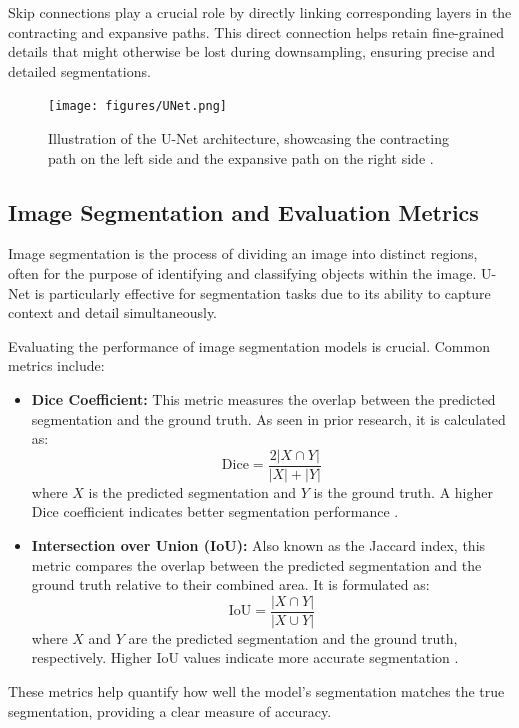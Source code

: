 \documentclass[preprint,12pt]{elsarticle}
\begin{document}
Skip connections play a crucial role by directly linking corresponding layers in the contracting and expansive paths. This direct connection helps retain fine-grained details that might otherwise be lost during downsampling, ensuring precise and detailed segmentations.

\begin{figure}[h!]
\centering
\texttt{[image: figures/UNet.png]}
\caption{Illustration of the U-Net architecture, showcasing the contracting path on the left side and the expansive path on the right side \cite{ronneberger2015u}.}
\label{fig:unet_architecture}
\end{figure}

\subsection{Image Segmentation and Evaluation Metrics}

Image segmentation is the process of dividing an image into distinct regions, often for the purpose of identifying and classifying objects within the image. U-Net is particularly effective for segmentation tasks due to its ability to capture context and detail simultaneously.

Evaluating the performance of image segmentation models is crucial. Common metrics include:

\begin{itemize}
    \item \textbf{Dice Coefficient:} This metric measures the overlap between the predicted segmentation and the ground truth. As seen in prior research, it is calculated as:
    \[
    \text{Dice} = \frac{2|X \cap Y|}{|X| + |Y|}
    \]
    where \(X\) is the predicted segmentation and \(Y\) is the ground truth. A higher Dice coefficient indicates better segmentation performance \cite{milletari2016v}.

    \item \textbf{Intersection over Union (IoU):} Also known as the Jaccard index, this metric compares the overlap between the predicted segmentation and the ground truth relative to their combined area. It is formulated as:
    \[
    \text{IoU} = \frac{|X \cap Y|}{|X \cup Y|}
    \]
    where \(X\) and \(Y\) are the predicted segmentation and the ground truth, respectively. Higher IoU values indicate more accurate segmentation \cite{rahman2016optimizing}.
\end{itemize}

These metrics help quantify how well the model's segmentation matches the true segmentation, providing a clear measure of accuracy.
\end{document}
